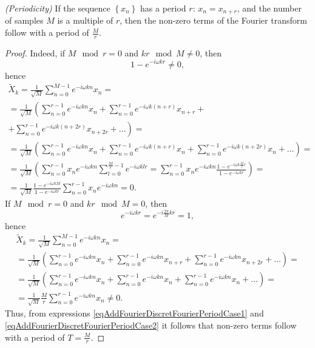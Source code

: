 \begin{lemma}
\emph{(Periodicity)}
\label{lemmaAddFourierDiscretFourierPeriod}
If the sequence $\left\{x_n\right\}$ has a period $r$: $x_n =
x_{n + r}$, and the number of samples $M$ is a multiple of $r$, then the non-zero terms of the Fourier transform follow with a period of $\frac{M}{r}$.
\begin{proof}
Indeed, if $M \mod r = 0$ and $k r \mod M \ne 0$,
then
\[
1 - e^{-i \omega k r} \ne 0,
\]
hence
\begin{eqnarray}
\tilde{X}_k = \frac{1}{\sqrt{M}}\sum_{n = 0}^{M - 1}e^{-i \omega k n}x_n = 
\nonumber \\
= \frac{1}{\sqrt{M}} \left(
\sum_{n = 0}^{r - 1}e^{-i \omega k n} x_n + 
\sum_{n = 0}^{r - 1}e^{-i \omega k \left(n + r \right) } x_{n+r} +
\right.
\nonumber \\
\left. +
\sum_{n = 0}^{r - 1}e^{-i \omega k \left(n + 2r \right) } x_{n+2r} + 
\dots  \right)=
\nonumber \\
= \frac{1}{\sqrt{M}} \left(
\sum_{n = 0}^{r - 1}e^{-i \omega k n} x_n + 
\sum_{n = 0}^{r - 1}e^{-i \omega k \left(n + r \right) } x_n + 
\sum_{n = 0}^{r - 1}e^{-i \omega k \left(n + 2r \right) } x_n + 
\dots \right) =
\nonumber \\
= \frac{1}{\sqrt{M}} \left( \sum_{n = 0}^{r - 1} x_n e^{-i \omega k n} 
\sum_{l = 0}^{\frac{M}{r}- 1} e^{-i \omega k l r } = 
\sum_{n = 0}^{r - 1} x_n e^{-i \omega k n} 
\frac{1 - e^{-i \omega k \frac{M}{r} r }}{1 - e^{-i \omega k r }}
\right) = 
\nonumber \\
=
\frac{1}{\sqrt{M}}
\frac{1 - e^{-i \omega k M }}{1 - e^{-i \omega k r}}
\sum_{n = 0}^{r - 1} x_n e^{-i \omega k n} = 0.
\label{eqAddFourierDiscretFourierPeriodCase1}
\end{eqnarray}
If $M \mod r = 0$ and $k r \mod M = 0$, then
\[
e^{-i \omega k r } = e^{-i \frac{2 \pi }{M} k r } = 1,
\]
hence
\begin{eqnarray}
\tilde{X}_k = \frac{1}{\sqrt{M}} \sum_{n = 0}^{M - 1}e^{-i \omega k n}x_n = 
\nonumber \\
= \frac{1}{\sqrt{M}} \left(
\sum_{n = 0}^{r - 1}e^{-i \omega k n} x_n + 
\sum_{n = 0}^{r - 1}e^{-i \omega k n } x_{n+r} + 
\sum_{n = 0}^{r - 1}e^{-i \omega k n } x_{n+2r} + 
\dots \right)=
\nonumber \\
= \frac{1}{\sqrt{M}} \left(
\sum_{n = 0}^{r - 1}e^{-i \omega k n} x_n + 
\sum_{n = 0}^{r - 1}e^{-i \omega k n  } x_n + 
\sum_{n = 0}^{r - 1}e^{-i \omega k n  } x_n + 
\dots \right) = 
\nonumber \\ 
= \frac{1}{\sqrt{M}} \frac{M}{r} \sum_{n = 0}^{r - 1}e^{-i \omega k n  } x_n \ne 0.
\label{eqAddFourierDiscretFourierPeriodCase2}
\end{eqnarray}
Thus, from expressions 
\eqref{eqAddFourierDiscretFourierPeriodCase1} and 
\eqref{eqAddFourierDiscretFourierPeriodCase2} it follows that
non-zero terms follow with a period of $T = \frac{M}{r}$.
\end{proof}
\end{lemma}

